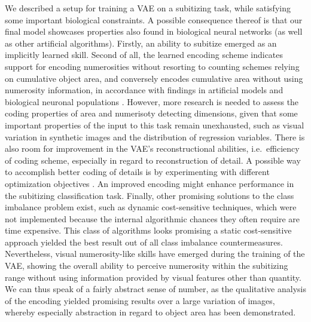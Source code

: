 \documentclass[twocolumn]{article}
\begin{document}
We described a setup for training a VAE on a subitizing task, while
satisfying some important biological constraints. A possible consequence
thereof is that our final model showcases properties also found in
biological neural networks (as well as other artificial algorithms).
Firstly, an ability to subitize emerged as an implicitly learned skill.
Second of all, the learned encoding scheme indicates support for
encoding numerosities without resorting to counting schemes relying on
cumulative object area, and conversely encodes cumulative area
without using numerosity information, in accordance with findings in artificial models \citep{stoianov2012} and biological neuronal populations \citep{harvey2013topographic, nieder2016neuronal}. However,
more research is needed to assess the coding properties of area and numerisoty detecting dimensions, given that some important properties of the input to this task remain unexhausted, such as visual variation in synthetic images and the distribution of regression variables.
There is also room for improvement in the VAE's reconstructional abilities,
i.e.~efficiency of coding scheme, especially in regard to reconstruction of detail. A possible way to accomplish better coding of details is by experimenting with different optimization objectives \citep[e.g.][]{dosovitskiy2016generating}. An improved encoding might enhance performance in the subitizing classification task. Finally, other promising solutions to the class imbalance problem exist, such as dynamic cost-sensitive techniques, which were not implemented because the internal algorithmic chances they often require are time expensive. This class of algorithms looks promising a static cost-sensitive approach yielded the best result out of all class imbalance countermeasures. 
Nevertheless, visual numerosity-like skills have emerged during the
training of the VAE, showing the overall ability to perceive numerosity
within the subitizing range without using information provided by visual
features other than quantity. We can thus speak of a fairly abstract
sense of number, as the qualitative analysis of the encoding yielded
promising results over a large variation of images, whereby especially
abstraction in regard to object area has been demonstrated.


\newpage

\end{document}
